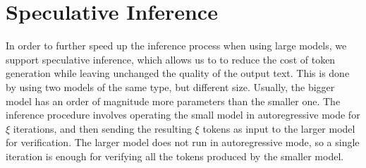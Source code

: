 \section{Speculative Inference}
In order to further speed up the inference process when using large models, we support speculative inference, which allows us to to reduce the cost of token generation while leaving unchanged the quality of the output text. This is done by using two models of the same type, but different size. Usually, the bigger model has an order of magnitude more parameters than the smaller one. The inference procedure involves operating the small model in autoregressive mode for $\xi$ iterations, and then sending the resulting $\xi$ tokens as input to the larger model for verification. The larger model does not run in autoregressive mode, so a single iteration is enough for verifying all the tokens produced by the smaller model.